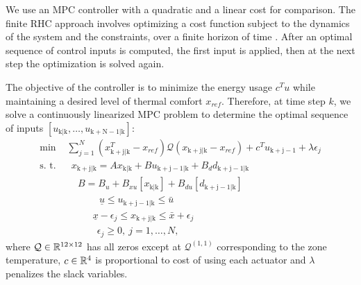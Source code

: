 We use an MPC controller with a quadratic and a linear cost for comparison.
The finite RHC approach involves optimizing a cost function subject to the dynamics of the system and the constraints, over a finite horizon of time \cite{Mayne2000}. After an optimal sequence of control inputs is computed, the first input is applied, then at the next step the optimization is solved again.


The objective of the controller is to minimize the energy usage $c^Tu$ while maintaining a desired level of thermal comfort $x_{ref}$.
Therefore, at time step $k$, we solve a continuously linearized MPC problem to determine the optimal sequence of inputs $[u_{\mathrm{k|k}},\dots,u_{\mathrm{k+N-1|k}}]$:
\begin{subequations}
\begin{align}
\text{min } & \sum_{j=1}^{N} ({x}^T_{\mathrm{k+j|k}} - x_{ref}) \mathcal{Q} ({x}_{\mathrm{k+j|k}} - x_{ref}) + c^Tu_{\mathrm{k+j-1}} +  \lambda\epsilon_j\\
\text{s.~t. } & \ \ x_{\mathrm{k+j|k}} =  Ax_{\mathrm{k|k}} + B u_{\mathrm{k+j-1|k}} + B_d d_{\mathrm{k+j-1|k}} \label{SE:mpc1} \\
& \ \ \ \ \ B = B_u + B_{xu}[x_{\mathrm{k|k}}] + B_{du}[d_{\mathrm{k+j-1|k}}] \label{SE:mpc2}\\
& \ \ \ \ \ \ \ \ \ \ \ \ \ \ \ \underline{u} \leq u_{\mathrm{k+j-1|k}} \leq \bar{u}\\ 
& \ \ \ \ \ \ \ \ \ \ \ \ \underline{x}-\epsilon_j \leq x_{\mathrm{k+j|k}} \leq \bar{x} + \epsilon_j\\\
& \ \ \ \ \ \ \ \ \ \ \ \ \ \ \epsilon_j \geq 0, \ j = 1,\dots,N,
\end{align}\label{E:mpc}
\end{subequations} 
\noindent where $\mathcal{Q} \in \mathbb{R}^{12 \times 12}$ has all zeros except at $\mathcal{Q}^{(1,1)}$ corresponding to the zone temperature, $c \in \mathbb{R}^{4}$ is proportional to cost of using each actuator and $\lambda$ penalizes the slack variables.